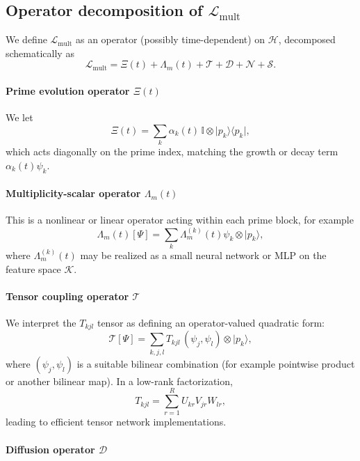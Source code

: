 \documentclass[11pt]{article}
\begin{document}
\subsection{Operator decomposition of $\mathcal{L}_{\mathrm{mult}}$}

We define $\mathcal{L}_{\mathrm{mult}}$ as an operator (possibly time-dependent) on $\mathcal{H}$, decomposed schematically as
\begin{equation}
\mathcal{L}_{\mathrm{mult}}
=
\Xi(t) + \Lambda_m(t) + \mathcal{T} + \mathcal{D} + \mathcal{N} + \mathcal{S}.
\end{equation}

\paragraph{Prime evolution operator $\Xi(t)$}

We let
\[
\Xi(t) = \sum_{k} \alpha_k(t)\, \mathbb{I} \otimes \lvert p_k\rangle\langle p_k\rvert,
\]
which acts diagonally on the prime index, matching the growth or decay term $\alpha_k(t)\psi_k$.

\paragraph{Multiplicity-scalar operator $\Lambda_m(t)$}

This is a nonlinear or linear operator acting within each prime block, for example
\[
\Lambda_m(t)[\Psi] = \sum_k \Lambda^{(k)}_m(t)\psi_k \otimes \lvert p_k\rangle,
\]
where $\Lambda_m^{(k)}(t)$ may be realized as a small neural network or MLP on the feature space $\mathcal{K}$.

\paragraph{Tensor coupling operator $\mathcal{T}$}

We interpret the $T_{kjl}$ tensor as defining an operator-valued quadratic form:
\begin{equation}
\mathcal{T}[\Psi] = \sum_{k,j,l} T_{kjl}\,(\psi_j,\psi_l)\otimes \lvert p_k\rangle,
\end{equation}
where $(\psi_j,\psi_l)$ is a suitable bilinear combination (for example pointwise product or another bilinear map). In a low-rank factorization,
\[
T_{kjl} = \sum_{r=1}^R U_{kr}V_{jr}W_{lr},
\]
leading to efficient tensor network implementations.

\paragraph{Diffusion operator $\mathcal{D}$}
\end{document}

